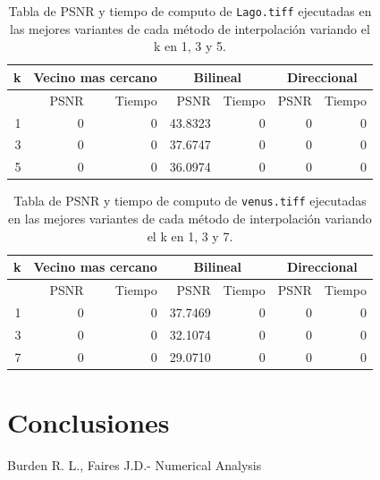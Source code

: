 \documentclass[a4paper]{article}
\newcounter{col}
\begin{document}
\begin{table}[H]
\centering
\begin{tabular}{|r|r|r|r|r|r|r|}
\hline
\multicolumn{1}{|c|}{k} & \multicolumn{2}{|c|}{Vecino mas cercano} & \multicolumn{2}{|c|}{Bilineal} & \multicolumn{2}{|c|}{Direccional} \\ \hline
  & PSNR & Tiempo & PSNR & Tiempo & PSNR & Tiempo \\ \hline
1 & 0 & 0 & 43.8323 & 0 &  0 & 0 \\ \hline
3 & 0 & 0 & 37.6747 & 0 &  0 & 0 \\ \hline
5 & 0 & 0 & 36.0974 & 0 &  0 & 0 \\ \hline
\end{tabular}
\caption{Tabla de PSNR y tiempo de computo de \texttt{Lago.tiff} ejecutadas en las mejores variantes de cada m\'etodo de interpolaci\'on variando el k en 1, 3 y 5.}
\label{}
\end{table}


\begin{table}[H]
\centering
\begin{tabular}{|r|r|r|r|r|r|r|}
\hline
\multicolumn{1}{|c|}{k} & \multicolumn{2}{|c|}{Vecino mas cercano} & \multicolumn{2}{|c|}{Bilineal} & \multicolumn{2}{|c|}{Direccional} \\ \hline
  & PSNR & Tiempo & PSNR & Tiempo & PSNR & Tiempo \\ \hline
1 & 0 & 0 & 37.7469 & 0 &  0 & 0 \\ \hline
3 & 0 & 0 & 32.1074 & 0 &  0 & 0 \\ \hline
7 & 0 & 0 &  29.0710 & 0 &  0 & 0 \\ \hline
\end{tabular}
\caption{Tabla de PSNR y tiempo de computo de \texttt{venus.tiff} ejecutadas en las mejores variantes de cada m\'etodo de interpolaci\'on variando el k en 1, 3 y 7.}
\label{}
\end{table}




\section{Conclusiones}

\begin{thebibliography}{abbrvnat}
 Burden R. L., Faires J.D.- Numerical Analysis
\end{thebibliography}
\end{document}
